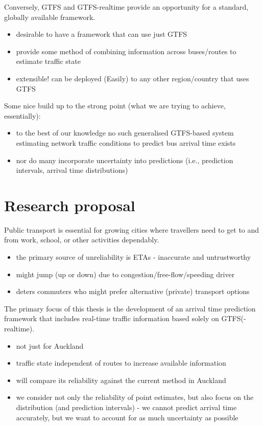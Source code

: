 Conversely, GTFS and GTFS-realtime provide an opportunity for a standard, globally available framework.
\begin{itemize}
\item desirable to have a framework that can use just GTFS
\item provide some method of combining information across buses/routes to estimate traffic state
\item extensible! can be deployed (Easily) to any other region/country that uses GTFS
\end{itemize}

Some nice build up to the strong point (what we are trying to achieve, essentially):
\begin{itemize}
\item to the best of our knowledge no such generalised GTFS-based system estimating network traffic conditions to predict bus arrival time exists
\item nor do many incorporate uncertainty into predictions (i.e., prediction intervals, arrival time distributions)
\end{itemize}

\section{Research proposal}

Public transport is essential for growing cities where travellers need to get to and from work, school, or other activities dependably.
\begin{itemize}
\item the primary source of unreliability is ETAs - inaccurate and untrustworthy
\item might jump (up or down) due to congestion/free-flow/speeding driver
\item deters commuters who might prefer alternative (private) transport options
\end{itemize}

The primary focus of this thesis is the development of an arrival time prediction framework that includes real-time traffic information based solely on GTFS(-realtime).
\begin{itemize}
\item not just for Auckland
\item traffic state independent of routes to increase available information
\item will compare its reliability against the current method in Auckland
\item we consider not only the reliability of point estimates, but also focus on the distribution (and prediction intervals) - we cannot predict arrival time accurately, but we want to account for as much uncertainty as possible
\end{itemize}

